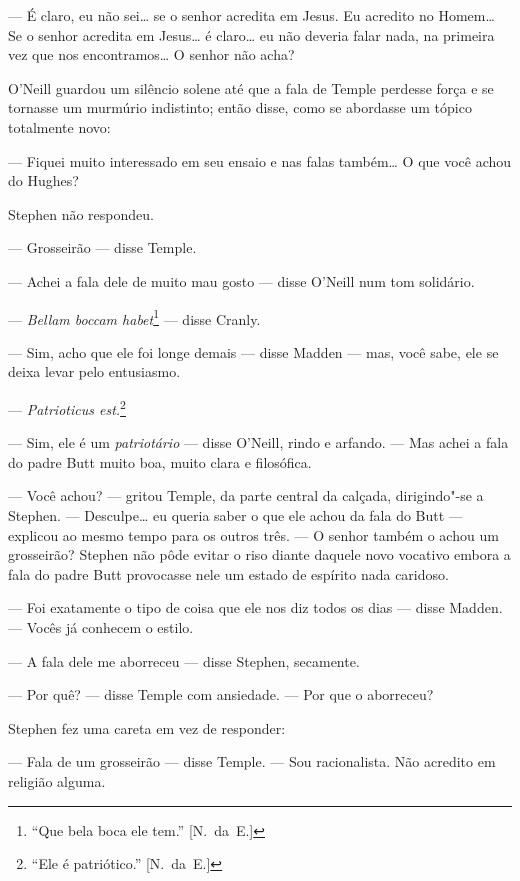 --- É claro, eu não sei\ldots{} se o senhor acredita em Jesus.  Eu acredito no
Homem\ldots{}  Se o senhor acredita em Jesus\ldots{} é claro\ldots{} eu não deveria falar
nada, na primeira vez que nos encontramos\ldots{}  O senhor não acha?

O’Neill guardou um silêncio solene até que a fala de Temple perdesse força e se
tornasse um murmúrio indistinto; então disse, como se abordasse um tópico
totalmente novo:

--- Fiquei muito interessado em seu ensaio e nas falas também\ldots{}  O que você
achou do Hughes?

Stephen não respondeu.

--- Grosseirão --- disse Temple.

--- Achei a fala dele de muito mau gosto --- disse O’Neill num tom solidário.

--- \textit{Bellam boccam habet}\footnote{ ``Que bela boca ele tem.'' [N.~da~E.]} --- disse Cranly.

--- Sim, acho que ele foi longe demais --- disse Madden --- mas, você sabe, ele
se deixa levar pelo entusiasmo.

--- \textit{Patrioticus est.}\footnote{ ``Ele é patriótico.'' [N.~da~E.]}

--- Sim, ele é um \textit{patriotário} --- disse O’Neill, rindo e arfando.  ---
Mas achei a fala do padre Butt muito boa, muito clara e filosófica.

--- Você achou? --- gritou Temple, da parte central da calçada, dirigindo"-se a
Stephen.  --- Desculpe\ldots{} eu queria saber o que ele achou da fala do Butt ---
explicou ao mesmo tempo para os outros três.  --- O senhor também o		
achou um grosseirão?									
Stephen não pôde evitar o riso diante daquele novo vocativo embora a fala do
padre Butt provocasse nele um estado de espírito nada caridoso.

--- Foi exatamente o tipo de coisa que ele nos diz todos os dias --- disse
Madden.  --- Vocês já conhecem o estilo.

--- A fala dele me aborreceu --- disse Stephen, secamente.

--- Por quê? --- disse Temple com ansiedade.  --- Por que o aborreceu?

Stephen fez uma careta em vez de responder:

--- Fala de um grosseirão --- disse Temple.  --- Sou racionalista.  Não
acredito em religião alguma.

